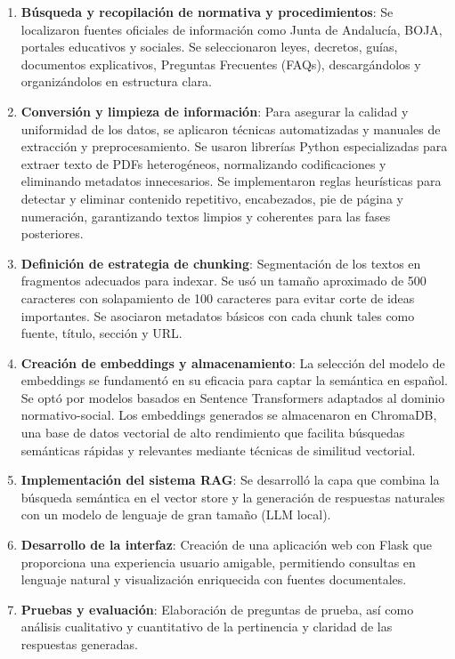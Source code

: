 \documentclass[a4paper,12pt]{article}
\begin{document}
\begin{enumerate}
    \item \textbf{Búsqueda y recopilación de normativa y procedimientos}: 
    Se localizaron fuentes oficiales de información como Junta de Andalucía, BOJA, portales educativos y sociales. Se seleccionaron leyes, decretos, guías, documentos explicativos, Preguntas Frecuentes (FAQs), descargándolos y organizándolos en estructura clara.

    \item \textbf{Conversión y limpieza de información}:
    Para asegurar la calidad y uniformidad de los datos, se aplicaron técnicas automatizadas y manuales de extracción y preprocesamiento. Se usaron librerías Python especializadas para extraer texto de PDFs heterogéneos, normalizando codificaciones y eliminando metadatos innecesarios. Se implementaron reglas heurísticas para detectar y eliminar contenido repetitivo, encabezados, pie de página y numeración, garantizando textos limpios y coherentes para las fases posteriores.

    \item \textbf{Definición de estrategia de chunking}: 
    Segmentación de los textos en fragmentos adecuados para indexar. Se usó un tamaño aproximado de 500 caracteres con solapamiento de 100 caracteres para evitar corte de ideas importantes. Se asociaron metadatos básicos con cada chunk tales como fuente, título, sección y URL.

    \item \textbf{Creación de embeddings y almacenamiento}: 
    La selección del modelo de embeddings se fundamentó en su eficacia para captar la semántica en español. Se optó por modelos basados en Sentence Transformers adaptados al dominio normativo-social. Los embeddings generados se almacenaron en ChromaDB, una base de datos vectorial de alto rendimiento que facilita búsquedas semánticas rápidas y relevantes mediante técnicas de similitud vectorial.

    \item \textbf{Implementación del sistema RAG}: 
    Se desarrolló la capa que combina la búsqueda semántica en el vector store y la generación de respuestas naturales con un modelo de lenguaje de gran tamaño (LLM local).

    \item \textbf{Desarrollo de la interfaz}: 
    Creación de una aplicación web con Flask que proporciona una experiencia usuario amigable, permitiendo consultas en lenguaje natural y visualización enriquecida con fuentes documentales.

    \item \textbf{Pruebas y evaluación}: 
    Elaboración de preguntas de prueba, así como análisis cualitativo y cuantitativo de la pertinencia y claridad de las respuestas generadas.
\end{enumerate}
\end{document}
